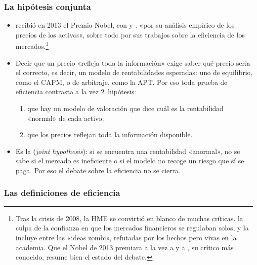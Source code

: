 \documentclass[11pt]{article}
\begin{document}
\subsubsection{La hipótesis conjunta}\label{sec:hipotesis-conjunta}

\begin{itemize}
\item {} recibió en 2013 el Premio Nobel, con  y , «por su análisis empírico de los precios de los activos»\nocite{Nobel2013Fama}, sobre todo por sus trabajos sobre la eficiencia de los mercados.\footnote{Tras la crisis de 2008, la HME se convirtió en blanco de muchas críticas. \textcite{Fox2009Myth} la culpa de la confianza en que los mercados financieros se regulaban solos, y \textcite{Quiggin2010Zombie} la incluye entre las «ideas zombi», refutadas por los hechos pero vivas en la academia. Que el Nobel de 2013 premiara a la vez a  y a , su crítico más conocido, resume bien el estado del debate.}
\item Decir que un precio «refleja toda la información» exige saber qué precio sería el correcto, es decir, un modelo de rentabilidades esperadas: uno de equilibrio, como el CAPM, o de arbitraje, como la APT. Por eso toda prueba de eficiencia contrasta a la vez 2~hipótesis:
  \begin{enumerate}
  \item que hay un modelo de valoración que dice cuál es la rentabilidad «normal» de cada activo;
  \item que los precios reflejan toda la información disponible.
  \end{enumerate}
\item Es la  (\emph{joint hypothesis})\nocite{Fama1970Efficient,Fama2014Two}: si se encuentra una rentabilidad «anormal», no se sabe si el mercado es ineficiente o si el modelo no recoge un riesgo que sí se paga. Por eso el debate sobre la eficiencia no se cierra.
\end{itemize}

\subsubsection{Las definiciones de eficiencia}\label{sec:definiciones-eficiencia}
\end{document}
